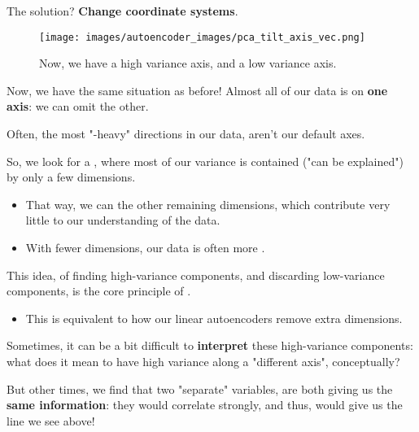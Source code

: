             The solution? \textbf{Change coordinate systems}.

            \begin{figure}[H]
                \centering
                \texttt{[image: images/autoencoder\_images/pca\_tilt\_axis\_vec.png]}
                \caption*{Now, we have a high variance axis, and a low variance axis.}
            \end{figure}

            Now, we have the same situation as before! Almost all of our data is on \textbf{one axis}: we can omit the other.\\

            \begin{concept}
                Often, the most "-heavy" directions in our data, aren't our default axes.

                So, we look for a , where most of our variance is contained ("can be explained") by only a few dimensions.

                \begin{itemize}
                    \item That way, we can  the other remaining dimensions, which contribute very little to our understanding of the data.
                    \item With fewer dimensions, our data is often more .
                \end{itemize}

                This idea, of finding high-variance components, and discarding low-variance components, is the core principle of .

                \begin{itemize}
                    \item This is equivalent to how our linear autoencoders remove extra dimensions.
                \end{itemize}
            \end{concept}

            Sometimes, it can be a bit difficult to \textbf{interpret} these high-variance components: what does it mean to have high variance along a "different axis", conceptually?

            But other times, we find that two "separate" variables, are both giving us the \textbf{same information}: they would correlate strongly, and thus, would give us the line we see above!

